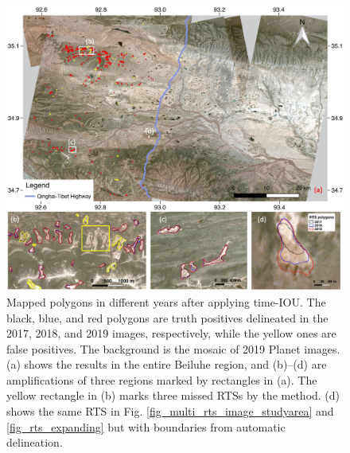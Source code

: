 \documentclass[authoryear,preprint,review,12pt]{elsarticle}
\begin{document}



\begin{figure} 
	\centering
	\includegraphics[width=14cm]{figs/multi_mapping_results_v2_trim.jpg}
	\caption{Mapped polygons in different years after applying time-IOU. The black, blue, and red polygons are truth positives delineated in the 2017, 2018, and 2019 images, respectively, while the yellow ones are false  positives. The background is the mosaic of 2019 Planet images. (a) shows the results in the entire Beiluhe region, and (b)--(d) are amplifications of three regions marked by rectangles in (a). The yellow rectangle in (b) marks three missed RTSs by the method. (d) shows the same RTS in Fig. \ref{fig_multi_rts_image_studyarea} and \ref{fig_rts_expanding} but with boundaries from automatic delineation.}
	\label{fig_mapping_results}
\end{figure}
\end{document}
